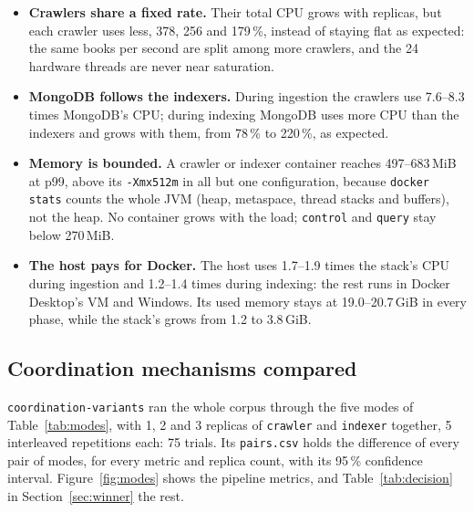 \documentclass[11pt,a4paper]{article}
\newcommand{\code}[1]{\nolinkurl{#1}}
\begin{document}
\begin{itemize}
\item \textbf{Crawlers share a fixed rate.} Their total CPU grows with replicas, but each crawler uses less, 378, 256
  and 179\,\%, instead of staying flat as expected: the same books per second are split among more crawlers, and the
  24 hardware threads are never near saturation.
\item \textbf{MongoDB follows the indexers.} During ingestion the crawlers use 7.6--8.3 times MongoDB's CPU; during
  indexing MongoDB uses more CPU than the indexers and grows with them, from 78\,\% to 220\,\%, as expected.
\item \textbf{Memory is bounded.} A crawler or indexer container reaches 497--683\,MiB at p99, above its
  \code{-Xmx512m} in all but one configuration, because \code{docker stats} counts the whole JVM (heap, metaspace,
  thread stacks and buffers), not the heap. No container grows with the load; \code{control} and \code{query} stay
  below 270\,MiB.
\item \textbf{The host pays for Docker.} The host uses 1.7--1.9 times the stack's CPU during ingestion and 1.2--1.4
  times during indexing: the rest runs in Docker Desktop's VM and Windows. Its used memory stays at 19.0--20.7\,GiB in
  every phase, while the stack's grows from 1.2 to 3.8\,GiB.
\end{itemize}

\subsection{Coordination mechanisms compared}
\label{sec:modes}

\code{coordination-variants} ran the whole corpus through the five modes of Table~\ref{tab:modes}, with 1, 2 and 3
replicas of \code{crawler} and \code{indexer} together, 5 interleaved repetitions each: 75 trials. Its
\code{pairs.csv} holds the difference of every pair of modes, for every metric and replica count, with its 95\,\%
confidence interval. Figure~\ref{fig:modes} shows the pipeline metrics, and Table~\ref{tab:decision} in
Section~\ref{sec:winner} the rest.
\end{document}
